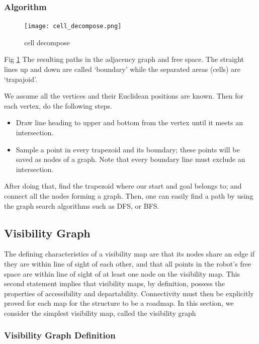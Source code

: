 \documentclass[11pt]{article}
\begin{document}
\subsubsection{Algorithm}
\begin{figure}[h]
  \centering
  \texttt{[image: cell\_decompose.png]}
  \caption{cell decompose}
  \label{fig:cell_decompose}
\end{figure}
Fig \ref{fig:cell_decompose} The resulting paths in the adjacency graph and free space. The straight lines up and down are called ‘boundary’ while the separated areas (cells) are ‘trapajoid’.

We assume all the vertices and their Euclidean positions are known. Then for each vertex, do the following steps.
\begin{itemize}
  \item Draw line heading to upper and bottom from the vertex until it meets an intersection.
  \item Sample a point in every trapezoid and its boundary; these points will be saved as nodes of a graph. Note that every boundary line must exclude an intersection.
\end{itemize}
After doing that, find the trapezoid where our start and goal belongs to; and connect all the nodes forming a graph. Then, one can easily find a path by using the graph search algorithms such as DFS, or BFS.

\subsection{Visibility Graph}

The defining characteristics of a visibility map are that its nodes share an edge if they are within line of sight of each other, and that all points in the robot's free space are within line of sight of at least one node on the visibility map. This second statement implies that visibility maps, by definition, possess the properties of accessibility and departability. Connectivity must then be explicitly proved for each map for the structure to be a roadmap. In this section, we consider the simplest visibility map, called the visibility graph

\subsubsection{Visibility Graph Definition}
\end{document}

